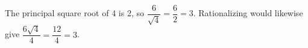 The principal square root of 4 is 2, so $\dfrac{6}{\sqrt4}=\dfrac{6}{2}=\boxed3$. Rationalizing would likewise give $\dfrac{6\sqrt4}{4}=\dfrac{12}{4}=3$.
